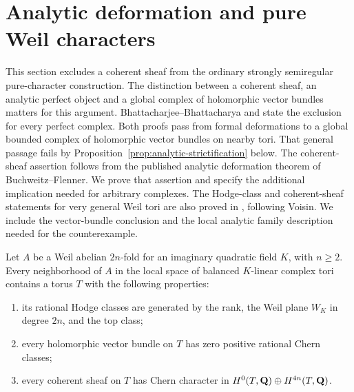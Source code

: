 \section{Analytic deformation and pure Weil characters}
\label{sec:analytic-weil-sheaves}

This section excludes a coherent sheaf from the ordinary strongly
semiregular pure-character construction.  The distinction between a
coherent sheaf, an analytic perfect object and a global complex of
holomorphic vector bundles matters for this argument.
Bhattacharjee--Bhattacharya \cite[Theorem~A7]{BBK3Sixfolds} and
\cite[Theorem~10]{BBSecantObjects} state the exclusion for every
perfect complex.  Both proofs pass from formal deformations to
a global bounded complex of holomorphic vector bundles on nearby
tori.  That general passage fails by
Proposition~\ref{prop:analytic-strictification} below.
The coherent-sheaf assertion follows from the published analytic
deformation theorem of Buchweitz--Flenner.  We prove that assertion
and specify the additional implication needed for arbitrary complexes.
The Hodge-class and coherent-sheaf statements for very general
Weil tori are also proved in \cite[Lemmas~2--3 and Proposition~2]{BBSecantObjects},
following Voisin.  We include the vector-bundle conclusion and
the local analytic family description needed for the counterexample.

\begin{lemma}
\label{lem:generic-weil-torus}
Let $A$ be a Weil abelian $2n$-fold for an imaginary quadratic
field $K$, with $n\ge2$.  Every neighborhood of $A$ in the local
space of balanced $K$-linear complex tori contains a torus $T$
with the following properties:
\begin{enumerate}[label=\textnormal{(\roman*)}]
\item its rational Hodge classes are generated by the rank,
the Weil plane $W_K$ in degree $2n$, and the top class;
\item every holomorphic vector bundle on $T$ has zero positive
rational Chern classes;
\item every coherent sheaf on $T$ has Chern character in
$H^0(T,\mathbf Q)\oplus H^{4n}(T,\mathbf Q)$.
\end{enumerate}
\end{lemma}

